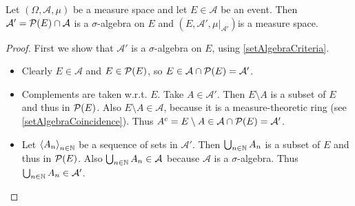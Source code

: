 \begin{lemma} \label{submeasurespace}
Let $(\Omega,\mathcal{A},\mu)$ be a measure space and let $E\in\mathcal{A}$ be an event. Then $\mathcal{A}' = \operatorname{\mathcal{P}}(E)\cap\mathcal{A}$ is a $\sigma$-algebra on $E$ and $(E,\mathcal{A}',\mu|_{\mathcal{A}'})$is a measure space.
\end{lemma}
\begin{proof}
First we show that $\mathcal{A}'$ is a $\sigma$-algebra on $E$, using \ref{setAlgebraCriteria}.
\begin{itemize}
\item Clearly $E\in \mathcal{A}$ and $E\in\operatorname{\mathcal{P}}(E)$, so $E\in\mathcal{A}\cap \operatorname{\mathcal{P}}(E) = \mathcal{A}'$.
\item Complements are taken w.r.t. $E$. Take $A\in \mathcal{A}'$. Then $E\setminus A$ is a subset of $E$ and thus in $\operatorname{\mathcal{P}}(E)$. Also $E\setminus A\in \mathcal{A}$, because it is a measure-theoretic ring (see \ref{setAlgebraCoincidence}). Thus $A^c = E\setminus A \in \mathcal{A}\cap \operatorname{\mathcal{P}}(E) = \mathcal{A}'$.
\item Let $\left\langle A_n \right\rangle_{n\in \mathbb{N}}$ be a sequence of sets in $\mathcal{A}'$. Then $\bigcup_{n\in \mathbb{N}}A_n$ is a subset of $E$ and thus in $\operatorname{\mathcal{P}}(E)$. Also $\bigcup_{n\in \mathbb{N}}A_n\in\mathcal{A}$ because $\mathcal{A}$ is a $\sigma$-algebra. Thus $\bigcup_{n\in \mathbb{N}}A_n\in\mathcal{A}'$.
\end{itemize}
\end{proof}

